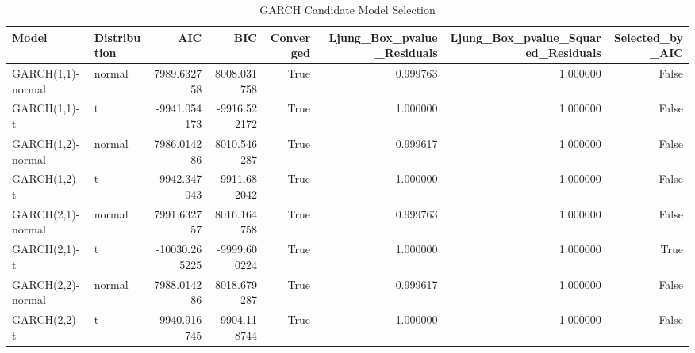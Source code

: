 \begin{table}
\caption{GARCH Candidate Model Selection}
\label{tab:4.5}
\begin{tabular}{llrrrrrr}
\toprule
Model & Distribution & AIC & BIC & Converged & Ljung_Box_pvalue_Residuals & Ljung_Box_pvalue_Squared_Residuals & Selected_by_AIC \\
\midrule
GARCH(1,1)-normal & normal & 7989.632758 & 8008.031758 & True & 0.999763 & 1.000000 & False \\
GARCH(1,1)-t & t & -9941.054173 & -9916.522172 & True & 1.000000 & 1.000000 & False \\
GARCH(1,2)-normal & normal & 7986.014286 & 8010.546287 & True & 0.999617 & 1.000000 & False \\
GARCH(1,2)-t & t & -9942.347043 & -9911.682042 & True & 1.000000 & 1.000000 & False \\
GARCH(2,1)-normal & normal & 7991.632757 & 8016.164758 & True & 0.999763 & 1.000000 & False \\
GARCH(2,1)-t & t & -10030.265225 & -9999.600224 & True & 1.000000 & 1.000000 & True \\
GARCH(2,2)-normal & normal & 7988.014286 & 8018.679287 & True & 0.999617 & 1.000000 & False \\
GARCH(2,2)-t & t & -9940.916745 & -9904.118744 & True & 1.000000 & 1.000000 & False \\
\bottomrule
\end{tabular}
\end{table}

